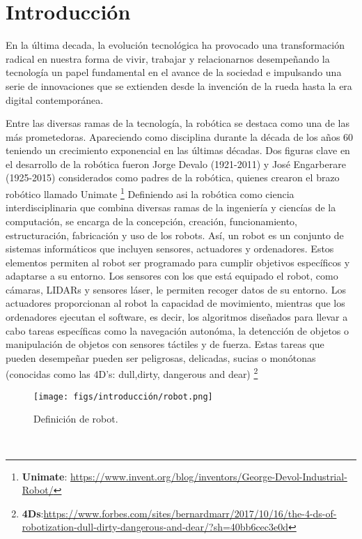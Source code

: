 \chapter{Introducción}
\label{cap:introduccion}
\setcounter{page}{1}

En la última decada, la evolución tecnológica ha provocado una transformación radical en nuestra forma de vivir, trabajar y relacionarnos desempeñando la tecnología un papel fundamental en el avance de la sociedad e impulsando una serie de innovaciones que se extienden desde la invención de la rueda hasta la era digital contemporánea. 
\bigskip

Entre las diversas ramas de la tecnología, la robótica se destaca como una de las más prometedoras. Apareciendo como disciplina durante la década de los años 60 teniendo un crecimiento exponencial en las últimas décadas. Dos figuras clave en el desarrollo de la robótica fueron Jorge Devalo (1921-2011) y 
José Engarberare (1925-2015) considerados como padres de la robótica, quienes crearon el brazo robótico llamado Unimate \footnote{\textbf{Unimate}: \url{https://www.invent.org/blog/inventors/George-Devol-Industrial-Robot/}}
\newline 
\newline 
Definiendo asi la robótica como ciencia interdisciplinaria que combina diversas ramas de la ingeniería y ciencías de la computación, se encarga de la concepción, creación, funcionamiento, estructuración, fabricación y uso de los robots.
Así, un robot es un conjunto de sistemas informáticos que incluyen sensores, actuadores y ordenadores. Estos elementos permiten al robot ser programado para cumplir objetivos específicos y adaptarse a su entorno. Los sensores con los que está equipado el robot, como cámaras, LIDARs y sensores láser, le permiten recoger datos de su entorno. 
Los actuadores proporcionan al robot la capacidad de movimiento, mientras que los ordenadores ejecutan el software, es decir, los algoritmos diseñados 
para llevar a cabo tareas específicas como la navegación autonóma, la detencción de objetos o manipulación de objetos con sensores táctiles y de fuerza.
Estas tareas que pueden desempeñar pueden ser peligrosas, delicadas, sucias o monótonas (conocidas como las 4D's: dull,dirty, dangerous and dear) \footnote{\textbf{4Ds}:\url{https://www.forbes.com/sites/bernardmarr/2017/10/16/the-4-ds-of-robotization-dull-dirty-dangerous-and-dear/?sh=40bb6cec3e0d}}

\begin{figure} [H]
  \begin{center}
    \texttt{[image: figs/introducción/robot.png]}
  \end{center}
  \caption{Definición de robot.}
  \label{fig:robot}
\end{figure}\

